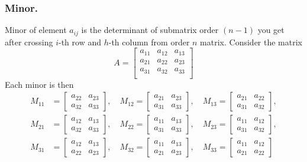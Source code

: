\documentclass[../main.tex]{subfiles}
\begin{document}
\subsubsection{Minor.}
Minor of element $a_{ij}$ is the determinant of submatrix order $(n-1)$ you get after crossing $i$-th row and $h$-th column from order $n$ matrix.
Consider the matrix
\begin{equation*}
	A=\begin{bmatrix}
		a_{11} & a_{12} & a_{13} \\
		a_{21} & a_{22} & a_{23} \\
		a_{31} & a_{32} & a_{33} \\
	\end{bmatrix}
\end{equation*}
Each minor is then
\begin{align*}
	M_{11} & = \begin{bmatrix} a_{22} & a_{23} \\ a_{32} & a_{33} \end{bmatrix}, \quad
	M_{12} = \begin{bmatrix} a_{21} & a_{23} \\ a_{31} & a_{33} \end{bmatrix}, \quad
	M_{13} = \begin{bmatrix} a_{21} & a_{22} \\ a_{31} & a_{32} \end{bmatrix},         \\
	M_{21} & = \begin{bmatrix} a_{12} & a_{13} \\ a_{32} & a_{33} \end{bmatrix}, \quad
	M_{22} = \begin{bmatrix} a_{11} & a_{13} \\ a_{31} & a_{33} \end{bmatrix}, \quad
	M_{23} = \begin{bmatrix} a_{11} & a_{12} \\ a_{31} & a_{32} \end{bmatrix},         \\
	M_{31} & = \begin{bmatrix} a_{12} & a_{13} \\ a_{22} & a_{23} \end{bmatrix}, \quad
	M_{32} = \begin{bmatrix} a_{11} & a_{13} \\ a_{21} & a_{23} \end{bmatrix}, \quad
	M_{33} = \begin{bmatrix} a_{11} & a_{12} \\ a_{21} & a_{22} \end{bmatrix}
\end{align*}
\end{document}
